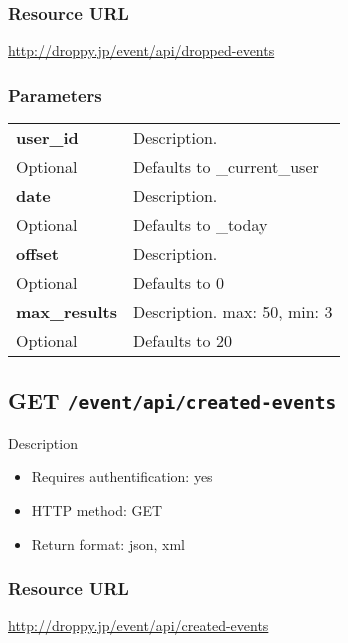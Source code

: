 \documentclass[11pt,a4paper]{article}
\newcommand{\content}[1]{\begin{minipage}{10cm}\vspace{2mm}#1\vspace{2mm}\end{minipage}}
\begin{document}
  \subsubsection*{Resource URL}
  \url{http://droppy.jp/event/api/dropped-events}
  \subsubsection*{Parameters}
  \begin{table}[h]
    \begin{center}
      \begin{tabular}{l l}
        \hline 
      \textbf{user\_id} & \content{Description. }
      \\
      Optional & Defaults to \_current\_user\\
      \hline
      \textbf{date} & \content{Description. }
      \\
      Optional & Defaults to \_today\\
      \hline
      \textbf{offset} & \content{Description. }
      \\
      Optional & Defaults to 0\\
      \hline
      \textbf{max\_results} & \content{Description. max: 50, min: 3}
      \\
      Optional & Defaults to 20\\
      \hline
      \end{tabular}
    \end{center}
  \end{table}
  
      \newpage
      
      
  \subsection*{GET {\tt /event/api/created-events}}
  Description
  \begin{itemize}
  \item Requires authentification: yes
  \item HTTP method: GET
  \item Return format: json, xml
  \end{itemize}
  \subsubsection*{Resource URL}
  \url{http://droppy.jp/event/api/created-events}
\end{document}
